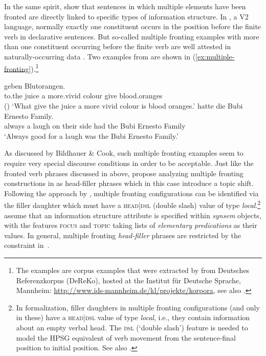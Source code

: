 \documentclass[output=paper,biblatex,babelshorthands,newtxmath,draftmode,colorlinks,citecolor=brown]{langscibook}
\begin{document}
\largerpage
{}
In the same spirit, \citet{BC2010a} show that sentences in which
multiple elements have been fronted are directly linked to specific
types of information structure. In , a V2 language, normally
exactly one constituent occurs in the position before the finite verb
in declarative sentences. But so-called multiple fronting examples
with more than one constituent occurring before the finite verb 
are well attested in naturally-occurring data \citep{Mueller2003b}. Two examples from
\citet{BC2010a} are shown in (\ref{ex:multiple-fronting}).\footnote{The examples are corpus examples that were extracted by \citet{BC2010a} from Deutsches Referenzkorpus (DeReKo), hosted at the Institut für Deutsche Sprache, Mannheim: \url{http://www.ids-mannheim.de/kl/projekte/korpora}, see also .}
\begin{exe}
  \ex\label{ex:multiple-fronting}
  \begin{xlist}
    \ex{} geben Blutorangen.\\
            \spacebr{}to.the juice \spacebr{}a more.vivid colour give blood.oranges\\\hfill()
      \trans `What give the juice a more vivid colour is blood oranges.'
    \ex{} hatte die Bubi Ernesto Family.\\
            \spacebr{}always \spacebr{}a laugh on their side had the Bubi Ernesto Family\\
        \trans `Always good for a laugh was the Bubi Ernesto Family.'
  \end{xlist}

\end{exe}

As discussed by Bildhauer \& Cook, such multiple fronting
examples seem to require very special discourse conditions in order to
be acceptable. Just like the fronted verb phrases discussed in
 above, \citet{BC2010a} propose
analyzing multiple fronting constructions in  as head-filler
phrases which in this case introduce a topic shift. Following the
approach by \citet{Mueller2005d}, multiple fronting
configurations can be identified via the filler daughter which must
have a \textsc{head|dsl} (double slash) value of type
\textit{local}.\footnote{In  formalization, filler daughters in multiple fronting configurations (and only in these) have a  \textsc{head|dsl} value of type \textit{local}, i.e., they contain information about an empty verbal head. The \textsc{dsl} (‘double slash’) feature is needed to model the HPSG equivalent of verb movement from the sentence-final position to initial position. See also .} \citet{BC2010a} assume that an
information structure attribute is specified within \textit{synsem}
objects, with the features \textsc{focus} and \textsc{topic} taking
lists of \textit{elementary predications} as their values. In general,
multiple fronting \textit{head-filler} phrases are restricted by the
constraint in~.
\end{document}
